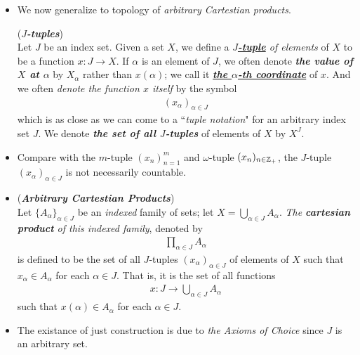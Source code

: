 \documentclass[11pt]{article}
\begin{document}
\begin{itemize}
\item We now generalize to topology of \emph{arbitrary Cartestian products}.
\begin{definition} (\emph{\textbf{$J$-tuples}})\\
Let $J$ be an index set. Given a set $X$, we define a \emph{\underline{\textbf{$J$-tuple}} of elements} of $X$ to be a function $x : J \rightarrow X$. If $\alpha$ is an element of $J$, we often denote \emph{\textbf{the value of $X$ at $\alpha$}} by $X_{\alpha}$ rather than $x(\alpha)$; we call it \underline{\emph{\textbf{the $\alpha$-th coordinate}}} of $x$. And we often \emph{denote the function $x$ itself} by the symbol
\begin{align*}
(x_{\alpha})_{\alpha \in J}
\end{align*}
which is as close as we can come to a ``\emph{tuple notation}" for an arbitrary index set $J$. We denote \emph{\textbf{the set of all $J$-tuples}} of elements of $X$ by $X^{J}$.
\end{definition}

\item \begin{remark}
Compare with the $m$-tuple $(x_n)_{n=1}^{m}$ and $\omega$-tuple $(x_{n})_{n \in {\mathbb Z}_{+}}$, the $J$-tuple $(x_{\alpha})_{\alpha \in J}$ is not necessarily countable.
\end{remark}

\item \begin{definition} (\emph{\textbf{Arbitrary Cartestian Products}})\\
Let $\{A_{\alpha}\}_{\alpha \in J}$ be an \emph{indexed} family of sets; let $X = \bigcup_{\alpha \in J}A_{\alpha}$. \emph{The \textbf{cartesian product} of this indexed family}, denoted by
\begin{align*}
\prod_{\alpha \in J} A_{\alpha}
\end{align*}
is defined to be the set of all $J$-tuples $(x_{\alpha})_{\alpha \in J}$ of elements of $X$ such that $x_{\alpha} \in A_{\alpha}$ for each $\alpha \in J$. That is, it is the set of all functions
\begin{align*}
x: J \rightarrow \bigcup_{\alpha \in J}A_{\alpha}
\end{align*}
such that $x(\alpha) \in A_{\alpha}$ for each $\alpha \in J$.
\end{definition}

\item \begin{remark}
The existance of just construction is due to \emph{the Axioms of Choice} since $J$ is an arbitrary set.
\end{remark}


\end{itemize}
\end{document}
